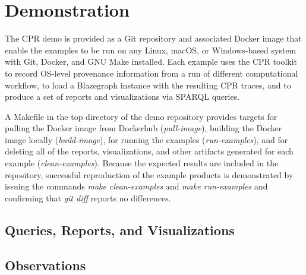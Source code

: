 \section{Demonstration}

The CPR demo is provided as a Git repository and associated Docker image that enable the examples to be run on any Linux, macOS, or Windows-based system with Git, Docker, and GNU Make installed.  Each example uses the CPR toolkit to record OS-level provenance information from a run of different computational workflow, to load a Blazegraph instance with the resulting CPR traces, and to produce a set of reports and visualizations via SPARQL queries.

A Makefile in the top directory of the demo repository provides targets for pulling the Docker image from Dockerhub (\emph{pull-image}), building the Docker image locally (\emph{build-image}), for running the examples (\emph{run-examples}), and for deleting all of the reports, visualizations, and other artifacts generated for each example (\emph{clean-examples}). Because the expected results are included in the repository, successful reproduction of the example products is demonstrated by issuing the commands \emph{make clean-examples} and \emph{make run-examples} and confirming that \emph{git diff} reports no differences.

\subsection{Queries, Reports, and Visualizations}


\subsection{Observations}
